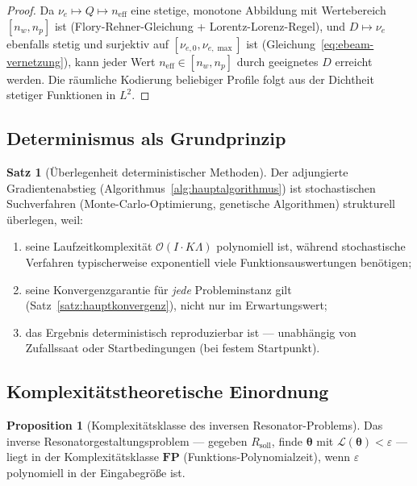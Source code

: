 ﻿\documentclass[a4paper,12pt]{article}
\theoremstyle{definition}
\newtheorem{satz}{Satz}[section]
\newtheorem{proposition}{Proposition}[section]
\newcommand{\ordre}[1]{\mathcal{O}\!\left(#1\right)}
\newcommand{\vect}[1]{\bm{#1}}
\begin{document}
	\begin{proof}
		Da $\nu_e \mapsto Q \mapsto n_\mathrm{eff}$ eine stetige, monotone Abbildung
		mit Wertebereich $[n_w, n_p]$ ist (Flory-Rehner-Gleichung + Lorentz-Lorenz-Regel),
		und $D \mapsto \nu_e$ ebenfalls stetig und surjektiv auf
		$[\nu_{e,0}, \nu_{e,\max}]$ ist (Gleichung~\eqref{eq:ebeam-vernetzung}),
		kann jeder Wert $n_\mathrm{eff} \in [n_w, n_p]$ durch geeignetes $D$ erreicht werden.
		Die räumliche Kodierung beliebiger Profile folgt aus der Dichtheit
		stetiger Funktionen in $L^2$.
	\end{proof}
	
	\subsection{Determinismus als Grundprinzip}
	
	\begin{satz}[Überlegenheit deterministischer Methoden]
		\label{satz:determinismus}
		Der adjungierte Gradientenabstieg (Algorithmus~\ref{alg:hauptalgorithmus})
		ist stochastischen Suchverfahren (Monte-Carlo-Optimierung, genetische
		Algorithmen) strukturell überlegen, weil:
		\begin{enumerate}[label=(\roman*)]
			\item seine Laufzeitkomplexität $\ordre{I \cdot K\Lambda}$ polynomiell ist,
			während stochastische Verfahren typischerweise exponentiell viele
			Funktionsauswertungen benötigen;
			\item seine Konvergenzgarantie für \emph{jede} Probleminstanz gilt
			(Satz~\ref{satz:hauptkonvergenz}), nicht nur im Erwartungswert;
			\item das Ergebnis deterministisch reproduzierbar ist --- unabhängig von
			Zufallssaat oder Startbedingungen (bei festem Startpunkt).
		\end{enumerate}
	\end{satz}
	
	\subsection{Komplexitätstheoretische Einordnung}
	
	\begin{proposition}[Komplexitätsklasse des inversen Resonator-Problems]
		\label{prop:komplexitaet}
		Das inverse Resonatorgestaltungsproblem --- gegeben $R_\mathrm{soll}$,
		finde $\vect{\theta}$ mit $\mathcal{L}(\vect{\theta}) < \varepsilon$ ---
		liegt in der Komplexitätsklasse $\mathbf{FP}$ (Funktions-Polynomialzeit),
		wenn $\varepsilon$ polynomiell in der Eingabegröße ist.
	\end{proposition}
	
\end{document}
